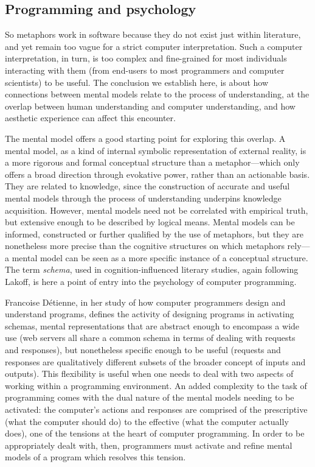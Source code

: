 \documentclass{article}
\begin{document}
\subsection{Programming and psychology}

So metaphors work in software because they do not exist just within literature, and yet remain too vague for a strict computer interpretation. Such a computer interpretation, in turn, is too complex and fine-grained for most individuals interacting with them (from end-users to most programmers and computer scientists) to be useful. The conclusion we establish here, is about how connections between mental models relate to the process of understanding, at the overlap between human understanding and computer understanding, and how aesthetic experience can affect this encounter.

The mental model offers a good starting point for exploring this overlap. A mental model, as a kind of internal symbolic representation of external reality, is a more rigorous and formal conceptual structure than a metaphor—which only offers a broad direction through evokative power, rather than an actionable basis. They are related to knowledge, since the construction of accurate and useful mental models through the process of understanding underpins knowledge acquisition. However, mental models need not be correlated with empirical truth, but extensive enough to be described by logical means. Mental models can be informed, constructed or further qualified by the use of metaphors, but they are nonetheless more precise than the cognitive structures on which metaphors rely—a mental model can be seen as a more specific instance of a conceptual structure. The term \emph{schema}, used in cognition-influenced literary studies, again following Lakoff, is here a point of entry into the psychology of computer programming.

Francoise Détienne, in her study of how computer programmers design and understand programs\cite{detienne_software_2012}, defines the activity of designing programs in activating schemas, mental representations that are abstract enough to encompass a wide use (web servers all share a common schema in terms of dealing with requests and responses), but nonetheless specific enough to be useful (requests and responses are qualitatively different subsets of the broader concept of inputs and outputs). This flexibility is useful when one needs to deal with two aspects of working within a programming environment. An added complexity to the task of programming comes with the dual nature of the mental models needing to be activated: the computer's actions and responses are comprised of the prescriptive (what the computer should do) to the effective (what the computer actually does), one of the tensions at the heart of computer programming. In order to be appropriately dealt with, then, programmers must activate and refine mental models of a program which resolves this tension.
\end{document}
